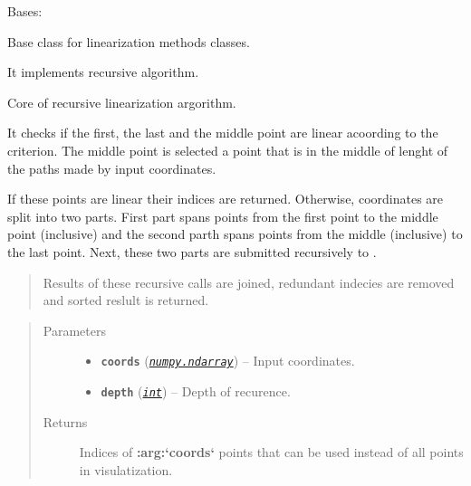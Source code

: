 \documentclass[a4paper,10pt,english]{sphinxmanual}
\begin{document}
\begin{fulllineitems}
\label{aqueduct.geom.traces:aqueduct.geom.traces.LinearizeRecursive}
Bases: \href{http://docs.python.org/2/library/functions.html\#object}{}

Base class for linearization methods classes.

It implements recursive algorithm.

\begin{fulllineitems}
\label{aqueduct.geom.traces:aqueduct.geom.traces.LinearizeRecursive.here}
Core of recursive linearization argorithm.

It checks if the first, the last and the middle point are linear acoording to the criterion. The middle point is selected a point that is in the middle of lenght of the paths made by input coordinates.

If these points are linear their indices are returned. Otherwise, coordinates are split into two parts. First part spans points from the first point to the middle point (inclusive) and the second parth spans points from the middle (inclusive) to the last point. Next, these two parts are submitted recursively to {\hyperref[aqueduct.geom.traces:aqueduct.geom.traces.LinearizeRecursive.here]{}}.
\begin{quote}

Results of these recursive calls are joined, redundant indecies are removed and sorted reslult is returned.
\end{quote}
\begin{quote}\begin{description}
\item[{Parameters}] \leavevmode\begin{itemize}
\item {} 
\textbf{\texttt{coords}} (\href{http://docs.scipy.org/doc/numpy/reference/generated/numpy.ndarray.html\#numpy.ndarray}{\emph{\texttt{numpy.ndarray}}}) -- Input coordinates.

\item {} 
\textbf{\texttt{depth}} (\href{http://docs.python.org/2/library/functions.html\#int}{\emph{\texttt{int}}}) -- Depth of recurence.

\end{itemize}

\item[{Returns}] \leavevmode
Indices of {\color{red}\bfseries{}:arg:{}`coords{}`} points that can be used instead of all points in visulatization.


\end{description}
\end{quote}
\end{fulllineitems}
\end{fulllineitems}
\end{document}
